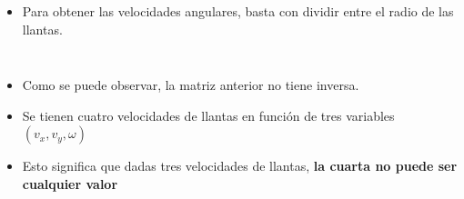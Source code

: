 \begin{frame}
\begin{columns}
\begin{column}{0.6\textwidth}
\begin{itemize}
  \item Para obtener las velocidades angulares, basta con dividir entre el radio de las llantas.
  \end{itemize}
\end{column}
\end{columns}
\[\]
\begin{itemize}
\item Como se puede observar, la matriz anterior no tiene inversa.
\item Se tienen cuatro velocidades de llantas en función de tres variables $(v_x,v_y, \omega)$
\item Esto significa que dadas tres velocidades de llantas, \textbf{la cuarta no puede ser cualquier valor}
\end{itemize}
\end{frame}

